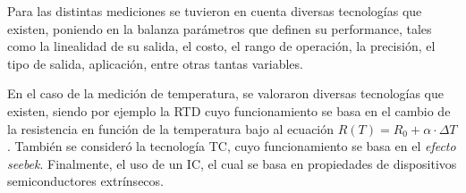 





Para las distintas mediciones se tuvieron en cuenta diversas tecnologías que existen, poniendo en la balanza parámetros que definen su performance, tales como la linealidad de su salida, el costo, el rango de operación, la precisión, el tipo de salida, aplicación, entre otras tantas variables.

En el caso de la medición de temperatura, se valoraron diversas tecnologías que existen, siendo por ejemplo la RTD cuyo funcionamiento se basa en el cambio de la resistencia en función de la temperatura bajo al ecuación $R(T)=R_0 + \alpha \cdot \Delta T$. También se consideró la tecnología TC, cuyo funcionamiento se basa en el \textit{efecto seebek}. Finalmente, el uso de un IC, el cual se basa en propiedades de dispositivos semiconductores extrínsecos.

